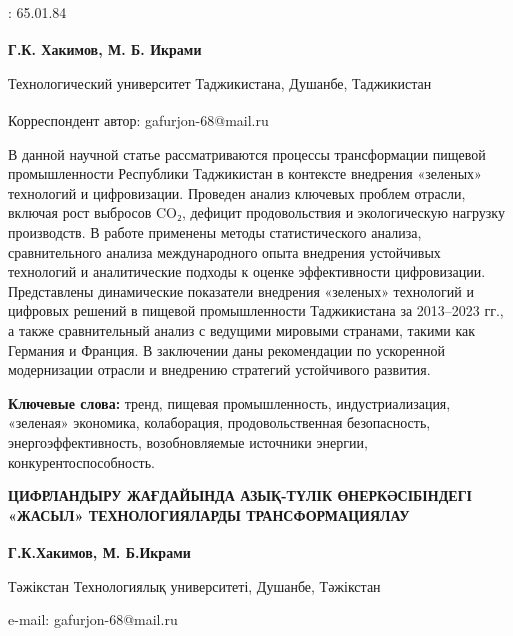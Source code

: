 : 65.01.84

\begin{articleheader}

{\bfseries
Г.К. Хакимов\textsuperscript{\envelope },
М. Б. Икрами
}
\end{articleheader}

\begin{affiliation}
Технологический университет Таджикистана, Душанбе, Таджикистан

\raggedright \textsuperscript{\envelope }Корреспондент автор: gafurjon-68@mail.ru
\end{affiliation}

В данной научной статье рассматриваются процессы трансформации пищевой
промышленности Республики Таджикистан в контексте внедрения «зеленых»
технологий и цифровизации. Проведен анализ ключевых проблем отрасли,
включая рост выбросов CO₂, дефицит продовольствия и экологическую
нагрузку производств. В работе применены методы статистического анализа,
сравнительного анализа международного опыта внедрения устойчивых
технологий и аналитические подходы к оценке эффективности цифровизации.
Представлены динамические показатели внедрения «зеленых» технологий и
цифровых решений в пищевой промышленности Таджикистана за 2013--2023
гг., а также сравнительный анализ с ведущими мировыми странами, такими
как Германия и Франция. В заключении даны рекомендации по ускоренной
модернизации отрасли и внедрению стратегий устойчивого развития.

{\bfseries Ключевые слова:} тренд, пищевая промышленность,
индустриализация, «зеленая» экономика, колаборация, продовольственная
безопасность, энергоэффективность, возобновляемые источники энергии,
конкурентоспособность.

\begin{articleheader}
{\bfseries ЦИФРЛАНДЫРУ ЖАҒДАЙЫНДА АЗЫҚ-ТҮЛІК ӨНЕРКӘСІБІНДЕГІ «ЖАСЫЛ» ТЕХНОЛОГИЯЛАРДЫ ТРАНСФОРМАЦИЯЛАУ}

{\bfseries
Г.К.Хакимов\textsuperscript{\envelope },
М. Б.Икрами
}
\end{articleheader}

\begin{affiliation}
Тәжікстан Технологиялық университеті, Душанбе, Тәжікстан

e-mail: gafurjon-68@mail.ru
\end{affiliation}

